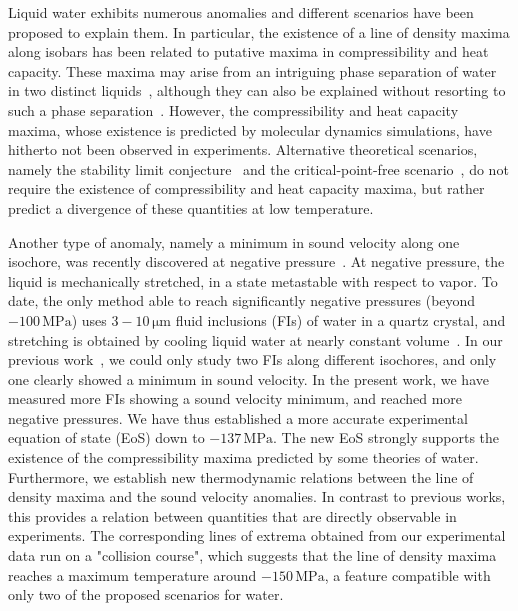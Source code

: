 \documentclass[12pt]{article}
\newcommand{\mrm}{\mathrm}
\newcommand{\unit}{\,\mrm}
\begin{document}
Liquid water exhibits numerous anomalies and different scenarios have been proposed to explain them\cite{Gallo_water_2016}. In particular, the existence of a line of density maxima along isobars has been related to putative maxima in compressibility\cite{Sastry_singularityfree_1996} and heat capacity\cite{Poole_density_2005}. These maxima may arise from an intriguing phase separation of water in two distinct liquids~\cite{Poole_phase_1992,Gallo_water_2016}, although they can also be explained without resorting to such a phase separation~\cite{Sastry_singularityfree_1996}. However, the compressibility and heat capacity maxima, whose existence is predicted by molecular dynamics simulations\cite{Poole_density_2005,Gonzalez_comprehensive_2016}, have hitherto not been observed in experiments. Alternative theoretical scenarios, namely the stability limit conjecture~\cite{Speedy_stabilitylimit_1982} and the critical-point-free scenario~\cite{Poole_effect_1994,Angell_insights_2008}, do not require the existence of compressibility and heat capacity maxima, but rather predict a divergence of these quantities at low temperature.

Another type of anomaly, namely a minimum in sound velocity along one isochore, was recently discovered at negative pressure~\cite{Pallares_anomalies_2014,Pallares_equation_2016}. At negative pressure, the liquid is mechanically stretched, in a state metastable with respect to vapor. To date, the only method able to reach significantly negative pressures (beyond $-100\unit{MPa}$) uses $3-10\unit{\mu m}$ fluid inclusions (FIs) of water in a quartz crystal, and stretching is obtained by cooling liquid water at nearly constant volume~\cite{Zheng_liquids_1991,Azouzi_coherent_2012}.
In our previous work~\cite{Pallares_anomalies_2014,Pallares_equation_2016}, we could only study two FIs along different isochores, and only one clearly showed a minimum in sound velocity. In the present work, we have measured more FIs showing a sound velocity minimum, and reached more negative pressures. We have thus established a more accurate experimental equation of state (EoS) down to $-137\unit{MPa}$. The new EoS strongly supports the existence of the compressibility maxima predicted by some theories of water. Furthermore, we establish new thermodynamic relations between the line of density maxima and the sound velocity anomalies. In contrast to previous works, this provides a relation between quantities that are directly observable in experiments. The corresponding lines of extrema obtained from our experimental data run on a "collision course"\cite{Debenedetti_physics_2013}, which suggests that the line of density maxima reaches a maximum temperature around $-150\unit{MPa}$, a feature compatible with only two of the proposed scenarios for water.
\end{document}
